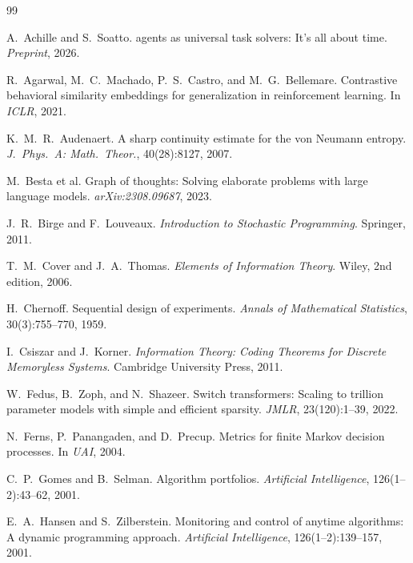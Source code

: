 \documentclass[10pt]{article}
\theoremstyle{paperplain}
\theoremstyle{paperdefinition}
\theoremstyle{paperremark}
\begin{document}
\begin{thebibliography}{99}

A.~Achille and S.~Soatto.
 agents as universal task solvers: It's all about time.
\newblock \emph{Preprint}, 2026.

R.~Agarwal, M.~C.~Machado, P.~S.~Castro, and M.~G.~Bellemare.
\newblock Contrastive behavioral similarity embeddings for generalization in reinforcement learning.
\newblock In \emph{ICLR}, 2021.

K.~M.~R.~Audenaert.
\newblock A sharp continuity estimate for the von {N}eumann entropy.
\newblock \emph{J.\ Phys.\ A: Math.\ Theor.}, 40(28):8127, 2007.

M.~Besta et al.
\newblock Graph of thoughts: Solving elaborate problems with large language models.
\newblock \emph{arXiv:2308.09687}, 2023.

J.~R.~Birge and F.~Louveaux.
\newblock \emph{Introduction to Stochastic Programming}.
\newblock Springer, 2011.

T.~M.~Cover and J.~A.~Thomas.
\newblock \emph{Elements of Information Theory}.
\newblock Wiley, 2nd edition, 2006.

H.~Chernoff.
\newblock Sequential design of experiments.
\newblock \emph{Annals of Mathematical Statistics}, 30(3):755--770, 1959.

I.~Csiszar and J.~Korner.
\newblock \emph{Information Theory: Coding Theorems for Discrete Memoryless Systems}.
\newblock Cambridge University Press, 2011.

W.~Fedus, B.~Zoph, and N.~Shazeer.
\newblock Switch transformers: Scaling to trillion parameter models with simple and efficient sparsity.
\newblock \emph{JMLR}, 23(120):1--39, 2022.

N.~Ferns, P.~Panangaden, and D.~Precup.
\newblock Metrics for finite Markov decision processes.
\newblock In \emph{UAI}, 2004.

C.~P.~Gomes and B.~Selman.
\newblock Algorithm portfolios.
\newblock \emph{Artificial Intelligence}, 126(1--2):43--62, 2001.

E.~A.~Hansen and S.~Zilberstein.
\newblock Monitoring and control of anytime algorithms: A dynamic programming approach.
\newblock \emph{Artificial Intelligence}, 126(1--2):139--157, 2001.


\end{thebibliography}
\end{document}

